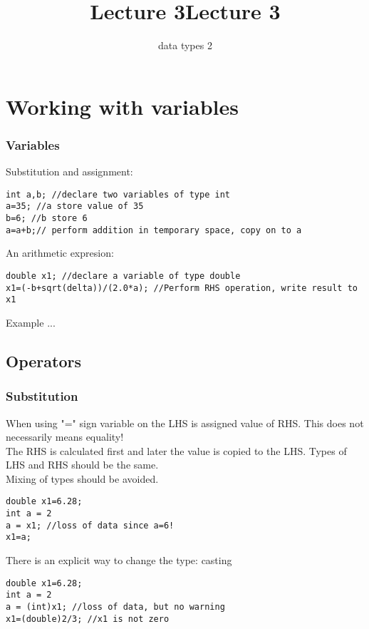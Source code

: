 \documentclass[10pt]{beamer}
\title{Lecture 3}
\subtitle{data types 2}
\date{}
\title{Lecture 3}
\date{}
\begin{document}
\frame{
    \titlepage
}


\section{Working with variables}

\begin{frame}[fragile]
  \frametitle{Variables}
  \centering
Substitution and assignment:
    \begin{lstlisting}
int a,b; //declare two variables of type int
a=35; //a store value of 35
b=6; //b store 6
a=a+b;// perform addition in temporary space, copy on to a
    \end{lstlisting}

An arithmetic expresion:
    \begin{lstlisting}
double x1; //declare a variable of type double
x1=(-b+sqrt(delta))/(2.0*a); //Perform RHS operation, write result to x1
    \end{lstlisting}

Example ...

\end{frame}

\subsection{Operators}

\begin{frame}[fragile]
  \frametitle{Substitution}
  \centering
  When using "=" sign variable on the LHS is assigned value of RHS. This does not necessarily means equality!\\
  The RHS is calculated first and later the value is copied to the LHS. Types of LHS and RHS should be the same.\\
  Mixing of types should be avoided.\\
\begin{lstlisting}
double x1=6.28;
int a = 2
a = x1; //loss of data since a=6!
x1=a;
\end{lstlisting}
There is an explicit way to change the type: casting
\begin{lstlisting}
double x1=6.28;
int a = 2
a = (int)x1; //loss of data, but no warning
x1=(double)2/3; //x1 is not zero
\end{lstlisting}


\end{frame}
\end{document}
